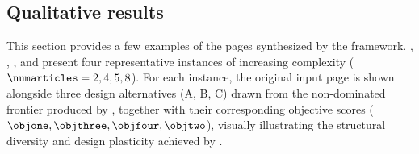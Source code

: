 \subsection{Qualitative results}

This section provides a few examples of the pages synthesized by the framework. , , , and  present four representative instances of increasing complexity ($\numarticles = 2, 4, 5, 8$). For each instance, the original input page is shown alongside three design alternatives (A, B, C) drawn from the non-dominated frontier produced by \methodName, together with their corresponding objective scores ($\objone, \objthree, \objfour, \objtwo$), visually illustrating the structural diversity and design plasticity achieved by \methodName.


